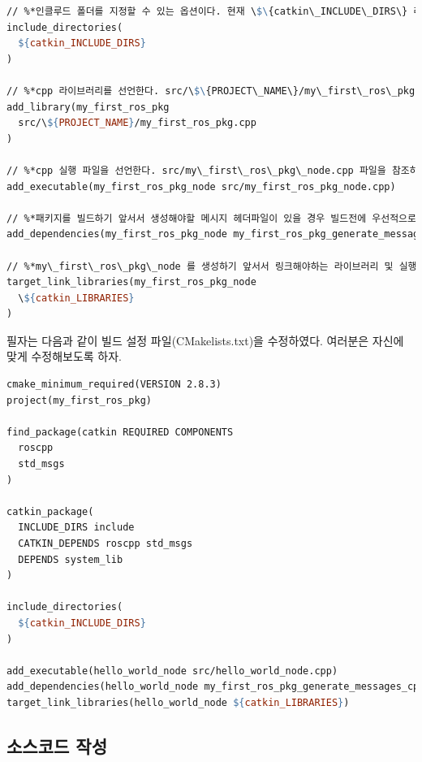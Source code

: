 \begin{lstlisting}[language=make,backgroundcolor=\color{white}]
// %*인클루드 폴더를 지정할 수 있는 옵션이다. 현재 \$\{catkin\_INCLUDE\_DIRS\} 라고 설정되어 있는데 이는 각 패키지안의 "include" 폴더를 의미하고 이 안의 헤더파일을 이용 하겠다는 설정이다.*)
include_directories(
  ${catkin_INCLUDE_DIRS}
)

// %*cpp 라이브러리를 선언한다. src/\$\{PROJECT\_NAME\}/my\_first\_ros\_pkg.cpp 파일을 참조하여 my\_first\_ros\_pkg 라는 라이브러리를 생성하게 된다.*)
add_library(my_first_ros_pkg
  src/\${PROJECT_NAME}/my_first_ros_pkg.cpp
)

// %*cpp 실행 파일을 선언한다. src/my\_first\_ros\_pkg\_node.cpp 파일을 참조하여 my\_first\_ros\_pkg\_node 라는 실행파일을 생성한다.*)
add_executable(my_first_ros_pkg_node src/my_first_ros_pkg_node.cpp)

// %*패키지를 빌드하기 앞서서 생성해야할 메시지 헤더파일이 있을 경우 빌드전에 우선적으로 메시지를 생성하라는 설정이다. 현재 my\_first\_ros\_pkg\_generate\_messages\_cpp 를 우선적으로 빌드하고 my\_first\_ros\_pkg\_node 를 빌드하게 하는 설정이다.*)
add_dependencies(my_first_ros_pkg_node my_first_ros_pkg_generate_messages_cpp)

// %*my\_first\_ros\_pkg\_node 를 생성하기 앞서서 링크해야하는 라이브러리 및 실행파일을 링크해주는 옵션이다.*)
target_link_libraries(my_first_ros_pkg_node
  \${catkin_LIBRARIES}
)
\end{lstlisting}

\noindent
필자는 다음과 같이 빌드 설정 파일(CMakelists.txt)을 수정하였다. 여러분은 자신에 맞게 수정해보도록 하자.

\begin{lstlisting}[language=make]
cmake_minimum_required(VERSION 2.8.3)
project(my_first_ros_pkg)
 
find_package(catkin REQUIRED COMPONENTS
  roscpp
  std_msgs
)
 
catkin_package(
  INCLUDE_DIRS include
  CATKIN_DEPENDS roscpp std_msgs
  DEPENDS system_lib
)
 
include_directories(
  ${catkin_INCLUDE_DIRS}
)
 
add_executable(hello_world_node src/hello_world_node.cpp)
add_dependencies(hello_world_node my_first_ros_pkg_generate_messages_cpp)
target_link_libraries(hello_world_node ${catkin_LIBRARIES})
\end{lstlisting}

\subsection{소스코드 작성}


